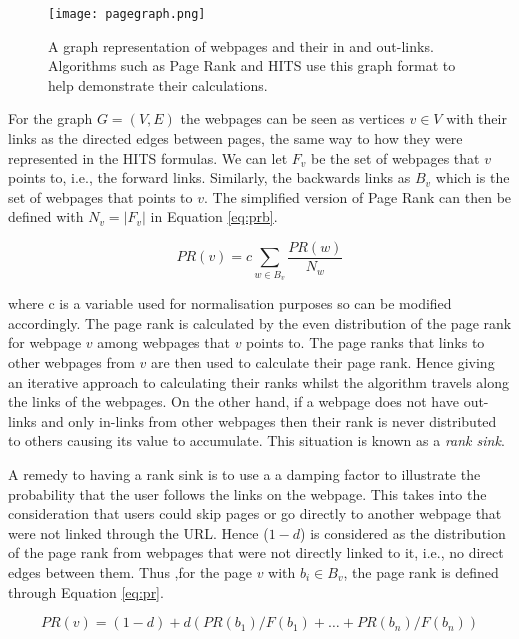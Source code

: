 \begin{figure}[!htb]
	\centering
	\texttt{[image: pagegraph.png]}
	\caption{A graph representation of webpages and their in and out-links. Algorithms such as Page Rank and HITS use this graph format to help demonstrate their calculations.}
	\label{fig:page}
\end{figure}

For the graph $G = (V, E)$ the webpages can be seen as vertices $v \in V$ with their links as the directed edges between pages, the same way to how they were represented in the HITS formulas. We can let $F_v$ be the set of webpages that $v$ points to, i.e., the forward links. Similarly, the backwards links as $B_v$ which is the set of webpages that points to $v$. The simplified version of Page Rank \cite{page1999pagerank} can then be defined with $N_v = \left|F_v\right|$ in Equation \ref{eq:prb}.

\begin{equation}\label{eq:prb}
PR(v) = c\sum_{w \in B_v}\frac{PR(w)}{N_w}
\end{equation}

where c is a variable used for normalisation purposes so can be modified accordingly. The page rank is calculated by the even distribution of the page rank for webpage $v$ among webpages that $v$ points to. The page ranks that links to other webpages from $v$ are then used to calculate their page rank. Hence giving an iterative approach to calculating their ranks whilst the algorithm travels along the links of the webpages. On the other hand, if a webpage does not have out-links and only in-links from other webpages then their rank is never distributed to others causing its value to accumulate. This situation is known as a \emph{rank sink}.

A remedy to having a rank sink is to use a a damping factor to illustrate the probability that the user follows the links on the webpage. This takes into the consideration that users could skip pages or go directly to another webpage that were not linked through the URL. Hence ($1-d$) is considered as the distribution of the page rank from webpages that were not directly linked to it, i.e., no direct edges between them. Thus ,for the page $v$ with $b_i \in B_v$, the page rank \cite{brin1998anatomy} is defined through Equation \ref{eq:pr}.

\begin{equation} \label{eq:pr}
PR(v) = (1-d) + d (PR(b_1)/F(b_1) + … + PR(b_n)/F(b_n))
\end{equation}

